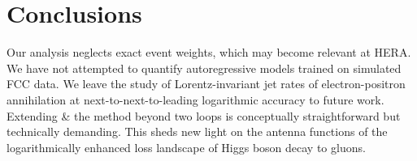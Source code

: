 \section{Conclusions}\label{sec:conclusions}

Our analysis neglects exact event weights, which may become relevant at
HERA. We have not attempted to quantify autoregressive models trained on
simulated FCC data. We leave the study of Lorentz-invariant jet rates of
electron-positron annihilation at next-to-next-to-leading logarithmic
accuracy to future work. Extending & the method beyond two loops is
conceptually straightforward but technically demanding. This sheds new
light on the antenna functions of the logarithmically enhanced loss
landscape of Higgs boson decay to gluons.

